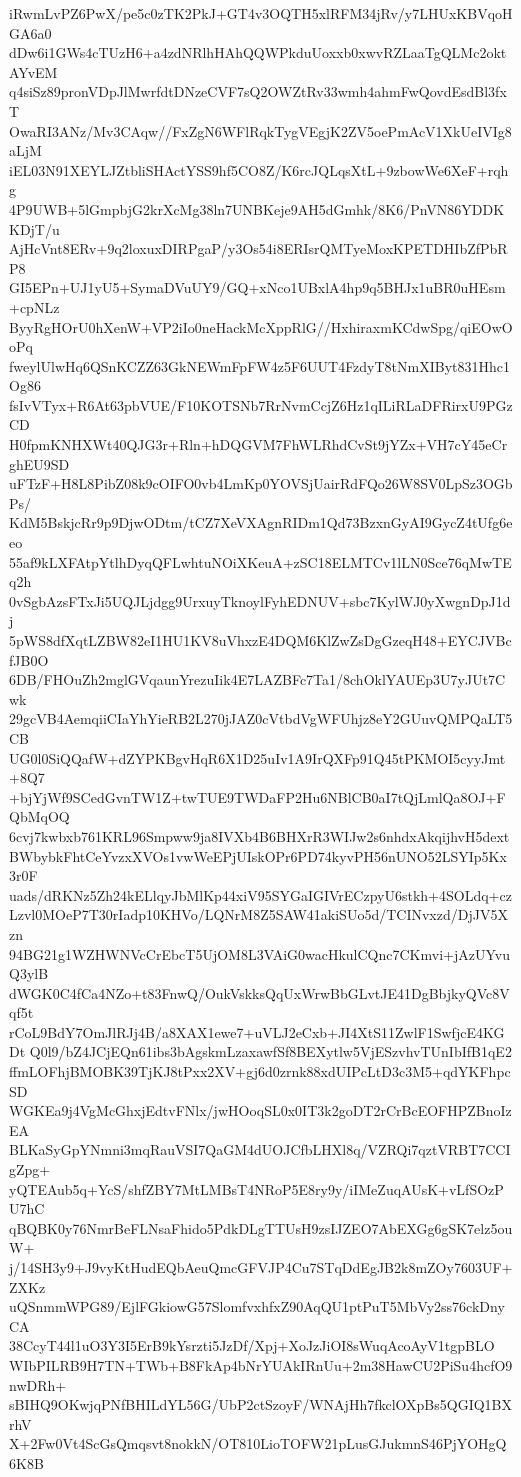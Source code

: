 iRwmLvPZ6PwX/pe5c0zTK2PkJ+GT4v3OQTH5xlRFM34jRv/y7LHUxKBVqoHGA6a0
dDw6i1GWs4cTUzH6+a4zdNRlhHAhQQWPkduUoxxb0xwvRZLaaTgQLMc2oktAYvEM
q4siSz89pronVDpJlMwrfdtDNzeCVF7sQ2OWZtRv33wmh4ahmFwQovdEsdBl3fxT
OwaRI3ANz/Mv3CAqw//FxZgN6WFlRqkTygVEgjK2ZV5oePmAcV1XkUeIVIg8aLjM
iEL03N91XEYLJZtbliSHActYSS9hf5CO8Z/K6rcJQLqsXtL+9zbowWe6XeF+rqhg
4P9UWB+5lGmpbjG2krXcMg38ln7UNBKeje9AH5dGmhk/8K6/PnVN86YDDKKDjT/u
AjHcVnt8ERv+9q2loxuxDIRPgaP/y3Os54i8ERIsrQMTyeMoxKPETDHIbZfPbRP8
GI5EPn+UJ1yU5+SymaDVuUY9/GQ+xNco1UBxlA4hp9q5BHJx1uBR0uHEsm+cpNLz
ByyRgHOrU0hXenW+VP2iIo0neHackMcXppRlG//HxhiraxmKCdwSpg/qiEOwOoPq
fweylUlwHq6QSnKCZZ63GkNEWmFpFW4z5F6UUT4FzdyT8tNmXIByt831Hhc1Og86
fsIvVTyx+R6At63pbVUE/F10KOTSNb7RrNvmCcjZ6Hz1qILiRLaDFRirxU9PGzCD
H0fpmKNHXWt40QJG3r+Rln+hDQGVM7FhWLRhdCvSt9jYZx+VH7cY45eCrghEU9SD
uFTzF+H8L8PibZ08k9cOIFO0vb4LmKp0YOVSjUairRdFQo26W8SV0LpSz3OGbPs/
KdM5BskjcRr9p9DjwODtm/tCZ7XeVXAgnRIDm1Qd73BzxnGyAI9GycZ4tUfg6eeo
55af9kLXFAtpYtlhDyqQFLwhtuNOiXKeuA+zSC18ELMTCv1lLN0Sce76qMwTEq2h
0vSgbAzsFTxJi5UQJLjdgg9UrxuyTknoylFyhEDNUV+sbc7KylWJ0yXwgnDpJ1dj
5pWS8dfXqtLZBW82eI1HU1KV8uVhxzE4DQM6KlZwZsDgGzeqH48+EYCJVBcfJB0O
6DB/FHOuZh2mglGVqaunYrezuIik4E7LAZBFc7Ta1/8chOklYAUEp3U7yJUt7Cwk
29gcVB4AemqiiCIaYhYieRB2L270jJAZ0cVtbdVgWFUhjz8eY2GUuvQMPQaLT5CB
UG0l0SiQQafW+dZYPKBgvHqR6X1D25uIv1A9IrQXFp91Q45tPKMOI5cyyJmt+8Q7
+bjYjWf9SCedGvnTW1Z+twTUE9TWDaFP2Hu6NBlCB0aI7tQjLmlQa8OJ+FQbMqOQ
6cvj7kwbxb761KRL96Smpww9ja8IVXb4B6BHXrR3WIJw2s6nhdxAkqijhvH5dext
BWbybkFhtCeYvzxXVOs1vwWeEPjUIskOPr6PD74kyvPH56nUNO52LSYIp5Kx3r0F
uads/dRKNz5Zh24kELlqyJbMlKp44xiV95SYGaIGIVrECzpyU6stkh+4SOLdq+cz
Lzvl0MOeP7T30rIadp10KHVo/LQNrM8Z5SAW41akiSUo5d/TCINvxzd/DjJV5Xzn
94BG21g1WZHWNVcCrEbcT5UjOM8L3VAiG0wacHkulCQnc7CKmvi+jAzUYvuQ3ylB
dWGK0C4fCa4NZo+t83FnwQ/OukVskksQqUxWrwBbGLvtJE41DgBbjkyQVc8Vqf5t
rCoL9BdY7OmJlRJj4B/a8XAX1ewe7+uVLJ2eCxb+JI4XtS11ZwlF1SwfjcE4KGDt
Q0l9/bZ4JCjEQn61ibs3bAgskmLzaxawfSf8BEXytlw5VjESzvhvTUnIbIfB1qE2
ffmLOFhjBMOBK39TjKJ8tPxx2XV+gj6d0zrnk88xdUIPcLtD3c3M5+qdYKFhpcSD
WGKEa9j4VgMcGhxjEdtvFNlx/jwHOoqSL0x0IT3k2goDT2rCrBcEOFHPZBnoIzEA
BLKaSyGpYNmni3mqRauVSI7QaGM4dUOJCfbLHXl8q/VZRQi7qztVRBT7CCIgZpg+
yQTEAub5q+YcS/shfZBY7MtLMBsT4NRoP5E8ry9y/iIMeZuqAUsK+vLfSOzPU7hC
qBQBK0y76NmrBeFLNsaFhido5PdkDLgTTUsH9zsIJZEO7AbEXGg6gSK7elz5ouW+
j/14SH3y9+J9vyKtHudEQbAeuQmcGFVJP4Cu7STqDdEgJB2k8mZOy7603UF+ZXKz
uQSnmmWPG89/EjlFGkiowG57SlomfvxhfxZ90AqQU1ptPuT5MbVy2ss76ckDnyCA
38CcyT44l1uO3Y3I5ErB9kYsrzti5JzDf/Xpj+XoJzJiOI8sWuqAcoAyV1tgpBLO
WIbPILRB9H7TN+TWb+B8FkAp4bNrYUAkIRnUu+2m38HawCU2PiSu4hcfO9nwDRh+
sBIHQ9OKwjqPNfBHILdYL56G/UbP2ctSzoyF/WNAjHh7fkclOXpBs5QGIQ1BXrhV
X+2Fw0Vt4ScGsQmqsvt8nokkN/OT810LioTOFW21pLusGJukmnS46PjYOHgQ6K8B
